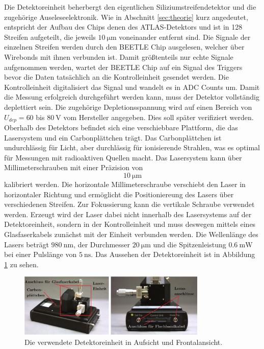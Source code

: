Die Detektoreinheit beherbergt den eigentlichen Siliziumstreifendetektor und die zugehörige Auseleseelektronik.
Wie in Abschnitt \ref{sec:theorie} kurz angedeutet, entspricht der Aufbau des Chips denen des ATLAS-Detektors und ist in 128 Streifen aufgeteilt, die jeweils $\SI{10}{\micro\metre}$ voneinander entfernt sind.
Die Signale der einzelnen Streifen werden durch den BEETLE Chip ausgelesen, welcher über Wirebonds mit ihnen verbunden ist.
Damit größtenteils nur echte Signale aufgenommen werden, wartet der BEETLE Chip auf ein Signal des Triggers bevor die Daten tatsächlich an die Kontrolleinheit gesendet werden.
Die Kontrolleinheit digitalisiert das Signal und wandelt es in ADC Counts um.
Damit die Messung erfolgreich durchgeführt werden kann, muss der Detektor vollständig deplettiert sein.
Die zugehörige Depletionsspannung wird auf einen Bereich von $U_{dep} = 60$ bis $\SI{80}{\volt}$ vom Hersteller angegeben.
Dies soll später verifiziert werden.
Oberhalb des Detektors befindet sich eine verschiebbare Plattform, die das Lasersystem und ein Carbonplättchen trägt.
Das Carbonplättchen ist undurchlässig für Licht, aber durchlässig für ionisierende Strahlen, was es optimal für Messungen mit radioaktiven Quellen macht.
Das Lasersystem kann über Millimeterschrauben mit einer Präzision von $$\SI{10}{\micro\metre}$$ kalibriert werden.
Die horizontale Millimeterschraube verschiebt den Laser in horizontaler Richtung und ermöglicht die Positioniereung des Lasers über verschiedenen Streifen.
Zur Fokussierung kann die vertikale Schraube verwendet werden.
Erzeugt wird der Laser dabei nicht innerhalb des Lasersystems auf der Detektoreinheit, sondern in der Kontrolleinheit und muss deswegen mittels eines Glasfaserkabels zunächst mit der Einheit verbunden werden.
Die Wellenlänge des Lasers beträgt $\SI{980}{\nano\metre}$, der Durchmesser $\SI{20}{\micro\metre}$ und die Spitzenleistung $\SI{0.6}{\milli\watt}$ bei einer Pulslänge von $\SI{5}{\nano\second}$.
Das Aussehen der Detektoreinheit ist in Abbildung \ref{fig:detektoreinheit} zu sehen.

\begin{figure}
  \centering
  \includegraphics[width=0.8\textwidth]{content/graphics/detektoreinheit.png}
  \caption{Die verwendete Detektoreinheit in Aufsicht und Frontalansicht.}
  \label{fig:detektoreinheit}
\end{figure}

